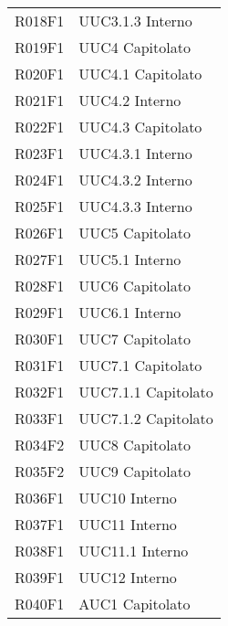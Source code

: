 \documentclass[../analisi-dei-requisiti.tex]{subfiles}
\begin{document}
\begin{longtable}[H]{>{\centering}m{5cm} >{\centering}m{5cm}}
  R018F1                               & UUC3.1.3 Interno              \\
  R019F1                               & UUC4 Capitolato               \\
  R020F1                               & UUC4.1 Capitolato             \\
  R021F1                               & UUC4.2 Interno                \\
  R022F1                               & UUC4.3 Capitolato             \\
  R023F1                               & UUC4.3.1 Interno              \\
  R024F1                               & UUC4.3.2 Interno              \\
  R025F1                               & UUC4.3.3 Interno              \\
  R026F1                               & UUC5 Capitolato               \\
  R027F1                               & UUC5.1 Interno                \\
  R028F1                               & UUC6 Capitolato               \\
  R029F1                               & UUC6.1 Interno                \\
  R030F1                               & UUC7 Capitolato               \\
  R031F1                               & UUC7.1 Capitolato             \\
  R032F1                               & UUC7.1.1 Capitolato           \\
  R033F1                               & UUC7.1.2 Capitolato           \\
  R034F2                               & UUC8 Capitolato               \\
  R035F2                               & UUC9 Capitolato               \\
  R036F1                               & UUC10 Interno                 \\
  R037F1                               & UUC11 Interno                 \\
  R038F1                               & UUC11.1 Interno               \\
  R039F1                               & UUC12 Interno                 \\
  R040F1                               & AUC1 Capitolato               \\

\end{longtable}
\end{document}
